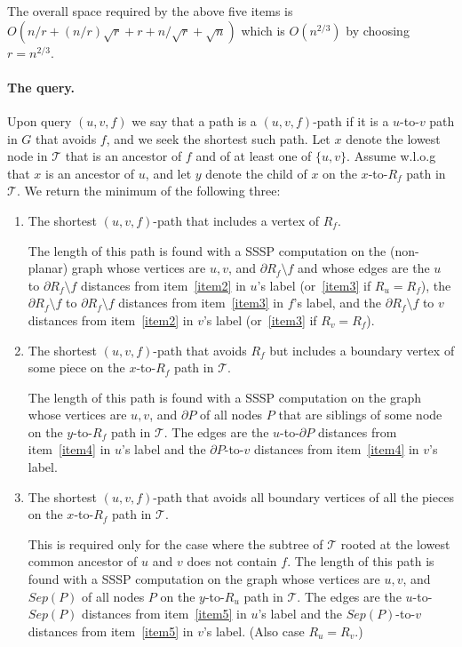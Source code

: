 \documentclass[11pt]{article}
\theoremstyle{plain}
\newcommand{\TG}{\mathcal{T}}
\begin{document}
\noindent The overall space required by the above five items is $O(n/r + (n/r)\sqrt{r} + r + n/\sqrt{r} + \sqrt{n})$ which is $O(n^{2/3})$ by choosing $r = n^{2/3}$.

\paragraph{The query.}
Upon query $(u,v,f)$ we say that a path is a $(u,v,f)$-path if it is a $u$-to-$v$ path in $G$ that avoids $f$, and we seek the shortest such path. Let $x$ denote the lowest node in $\TG$ that is an ancestor of $f$ and of at least one of $\{u,v\}$. Assume w.l.o.g that $x$ is an ancestor of $u$, and let $y$ denote the child of $x$ on the $x$-to-$R_f$ path in $\TG$. We return the minimum of the following three:    
\begin{enumerate}
\item The shortest $(u,v,f)$-path that includes a vertex of $R_f$. 

The length of this path is found with a SSSP computation on the (non-planar) graph whose vertices are $u,v$, and $\partial R_f\setminus {f}$ and whose edges are the $u$ to $\partial R_f\setminus {f}$ distances from item~\ref{item2} in $u$'s label (or~\ref{item3} if $R_u=R_f$), the $\partial R_f\setminus {f}$ to $\partial R_f\setminus {f}$ distances from item~\ref{item3} in $f$'s label, and the $\partial R_f\setminus {f}$ to $v$ distances from item~\ref{item2} in $v$'s label (or~\ref{item3} if $R_v=R_f$). 

\item The shortest $(u,v,f)$-path that avoids $R_f$ but includes a boundary vertex of some piece on the {\color{red}$x$}-to-$R_f$ path in $\TG$. 

The length of this path is found with a SSSP computation on the graph whose vertices are $u,v$, and $\partial P$ of all nodes   $P$ that are siblings of some node on the $y$-to-$R_f$ path in $\TG$. The edges are the $u$-to-$\partial P$ distances from item~\ref{item4} in $u$'s label and the $\partial P$-to-$v$ distances from item~\ref{item4} in $v$'s label.

\item The shortest $(u,v,f)$-path that avoids all boundary vertices of all the pieces on the {\color{red}$x$}-to-$R_f$ path in $\TG$. 

This is required only for the case where the subtree of $\TG$ rooted at the lowest common ancestor of $u$ and $v$ does not contain $f$. The length of this path is found with a SSSP computation on the graph whose vertices are $u,v$, and $Sep(P)$ of all nodes   $P$ on the $y$-to-$R_u$ path in $\TG$. The edges are the $u$-to-$Sep(P)$ distances from item~\ref{item5} in $u$'s label and the $Sep(P)$-to-$v$ distances from item~\ref{item5} in $v$'s label. {\color{red}(Also case $R_u=R_v$.)}
\end{enumerate}
\end{document}
